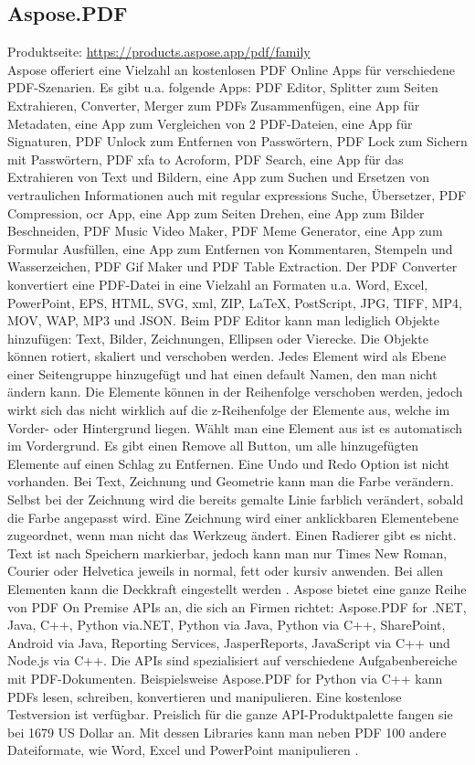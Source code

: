 \subsection{Aspose.PDF}
Produktseite: \url{https://products.aspose.app/pdf/family} \\
Aspose offeriert eine Vielzahl an kostenlosen PDF Online Apps für verschiedene PDF-Szenarien. Es gibt u.a. folgende Apps: PDF Editor, Splitter zum Seiten Extrahieren, Converter, Merger zum PDFs Zusammenfügen, eine App für Metadaten, eine App zum Vergleichen von 2 PDF-Dateien, eine App für Signaturen, PDF Unlock zum Entfernen von Passwörtern, PDF Lock zum Sichern mit Passwörtern, PDF \gls{xfa} to Acroform, PDF Search, eine App für das Extrahieren von Text und Bildern, eine App zum Suchen und Ersetzen von vertraulichen Informationen auch mit regular expressions Suche, Übersetzer, PDF Compression, \gls{ocr} App, eine App zum Seiten Drehen, eine App zum Bilder Beschneiden, PDF Music Video Maker, PDF Meme Generator, eine App zum Formular Ausfüllen, eine App zum Entfernen von Kommentaren, Stempeln und Wasserzeichen, PDF Gif Maker und PDF Table Extraction. Der PDF Converter konvertiert eine PDF-Datei in eine Vielzahl an Formaten u.a. Word, Excel, PowerPoint, EPS, HTML, SVG, \gls{xml}, ZIP, LaTeX, PostScript, JPG, TIFF, MP4, MOV, WAP, MP3 und JSON. Beim PDF Editor kann man lediglich Objekte hinzufügen: Text, Bilder, Zeichnungen, Ellipsen oder Vierecke. Die Objekte können rotiert, skaliert und verschoben werden. Jedes Element wird als Ebene einer Seitengruppe hinzugefügt und hat einen default Namen, den man nicht ändern kann. Die Elemente können in der Reihenfolge verschoben werden, jedoch wirkt sich das nicht wirklich auf die z-Reihenfolge der Elemente aus, welche im Vorder- oder Hintergrund liegen. Wählt man eine Element aus ist es automatisch im Vordergrund. Es gibt einen Remove all Button, um alle hinzugefügten Elemente auf einen Schlag zu Entfernen. Eine Undo und Redo Option ist nicht vorhanden. Bei Text, Zeichnung und Geometrie kann man die Farbe verändern. Selbst bei der Zeichnung wird die bereits gemalte Linie farblich verändert, sobald die Farbe angepasst wird. Eine Zeichnung wird einer anklickbaren Elementebene zugeordnet, wenn man nicht das Werkzeug ändert. Einen Radierer gibt es nicht. Text ist nach Speichern markierbar, jedoch kann man nur Times New Roman, Courier oder Helvetica jeweils in normal, fett oder kursiv anwenden. Bei allen Elementen kann die Deckkraft eingestellt werden \cite{aspose-pdf}. Aspose bietet eine ganze Reihe von PDF On Premise APIs an, die sich an Firmen richtet: Aspose.PDF for .NET, Java, C++, Python via.NET, Python via Java, Python via C++, SharePoint, Android via Java, Reporting Services, JasperReports, JavaScript via C++ und Node.js via C++. Die APIs sind spezialisiert auf verschiedene Aufgabenbereiche mit PDF-Dokumenten. Beispielsweise Aspose.PDF for Python via C++ kann PDFs lesen, schreiben, konvertieren und manipulieren. Eine kostenlose Testversion ist verfügbar. Preislich für die ganze API-Produktpalette fangen sie bei 1679 US Dollar an. Mit dessen Libraries kann man neben PDF 100 andere Dateiformate, wie Word, Excel und PowerPoint manipulieren \cite{aspose-api}. 

